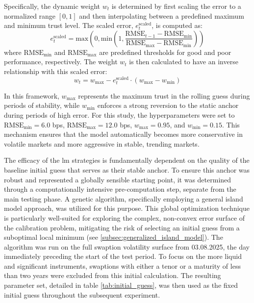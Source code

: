 Specifically, the dynamic weight $w_t$ is determined by first scaling the error to a normalized range $[0, 1]$ and then interpolating between a predefined maximum and minimum trust level. The scaled error, $e_t^{\text{scaled}}$, is computed as:
\begin{equation}
	e_t^{\text{scaled}} = \text{max}\left(0, \text{min}\left(1, \frac{\text{RMSE}_{t-1} - \text{RMSE}_{\text{min}}}{\text{RMSE}_{\text{max}} - \text{RMSE}_{\text{min}}}\right)\right)
\end{equation}
where $\text{RMSE}_{\text{min}}$ and $\text{RMSE}_{\text{max}}$ are predefined thresholds for good and poor performance, respectively. The weight $w_t$ is then calculated to have an inverse relationship with this scaled error:
\begin{equation}
	w_t = w_{\text{max}} - e_t^{\text{scaled}} \cdot (w_{\text{max}} - w_{\text{min}})
\end{equation}

In this framework, $w_{\text{max}}$ represents the maximum trust in the rolling guess during periods of stability, while $w_{\text{min}}$ enforces a strong reversion to the static anchor during periods of high error. For this study, the hyperparameters were set to $\text{RMSE}_{\text{min}} = 6.0$ bps, $\text{RMSE}_{\text{max}} = 12.0$ bps, $w_{\text{max}} = 0.95$, and $w_{\text{min}} = 0.15$. This mechanism ensures that the model automatically becomes more conservative in volatile markets and more aggressive in stable, trending markets.

The efficacy of the \ac{lm} strategies is fundamentally dependent on the quality of the baseline initial guess that serves as their stable anchor. To ensure this anchor was robust and represented a globally sensible starting point, it was determined through a computationally intensive pre-computation step, separate from the main testing phase. A genetic algorithm, specifically employing a general island model approach, was utilized for this purpose. This global optimization technique is particularly well-suited for exploring the complex, non-convex error surface of the calibration problem, mitigating the risk of selecting an initial guess from a suboptimal local minimum (see \ref{subsec:generalized_island_model}). The algorithm was run on the full swaption volatility surface from 03.08.2025, the day immediately preceding the start of the test period. To focus on the more liquid and significant instruments, swaptions with either a tenor or a maturity of less than two years were excluded from this initial calculation. The resulting parameter set, detailed in table \ref{tab:initial_guess}, was then used as the fixed initial guess throughout the subsequent experiment.

